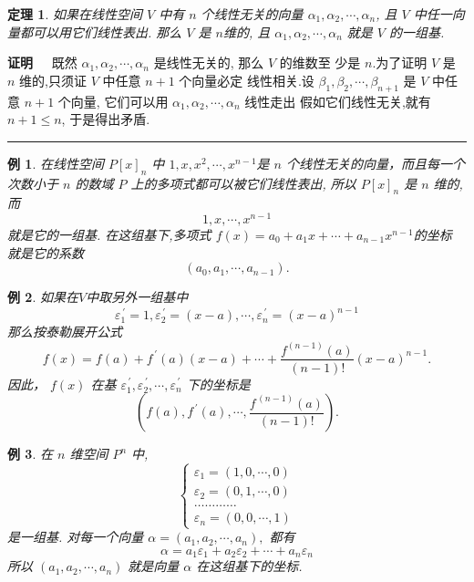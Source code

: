 \documentclass[13pt]{beamer}
\newtheorem{thm}{定理}
\newtheorem{exa}{例}
\def\qed{\nopagebreak\hfill{\rule{4pt}{7pt}}\medbreak}
\def\pf{{\bf 证明~~ }}
\def\a{\alpha}
\begin{document}
\begin{frame}
\begin{thm}
如果在线性空间 $V$ 中有 $n$ 个线性无关的向量 $\a_{1}, {\a}_{2}, \cdots, {\alpha_n}$, 
且 $V$ 中任一向量都可以用它们线性表出.
那么 $V$ 是 $n$维的, 
且 ${\a}_{1}, {\alpha}_{2}, \cdots, {\alpha}_{n}$ 就是 $V$ 的一组基.
\end{thm}
\pf 
既然 ${\alpha}_{1}, {\alpha}_{2}, \cdots, {\alpha}_{n}$ 是线性无关的, 那么 $V$ 的维数至
少是 $n$.为了证明 $V$ 是 $n$ 维的,只须证 $V$ 中任意 $n+1$ 个向量必定 线性相关.设 ${\beta}_{1}, {\beta}_{2}, \cdots, {\beta}_{n+1}$
是 $V$ 中任意 $n+1$ 个向量, 它们可以用 ${\alpha}_{1}, {\alpha}_{2}, \cdots, {\alpha}_{n}$ 线性走出
假如它们线性无关,就有 $n+1 \leqslant n$, 于是得出矛盾.
\qed
\end{frame}

\begin{frame}
\setcounter{exa}{0}
\begin{exa}
在线性空间 $P[x]_{n}$ 中
$1, x, x^{2}, \cdots, x^{n-1}$是 $n$ 个线性无关的向量，而且每一个次数小于 $n$ 的数域 $P$ 上的多项式都可以被它们线性表出,
所以 $P[x]_{n}$ 是 $n$ 维的,而 $$1, x, \cdots, x^{n-1}$$ 就是它的一组基.
在这组基下,多项式
$f(x)=a_{0}+a_{1} x+\cdots+a_{n-1} x^{n-1}$的坐标 
就是它的系数 $$\left(a_{0}, a_{1}, \cdots, a_{n-1}\right).$$
\end{exa}

\end{frame}

\begin{frame}
\addtocounter{exa}{-1}
\begin{exa}
如果在$V$中取另外一组基中
$$\varepsilon_{1}^{\, \prime}=1, {\varepsilon}_{2}^{\, \prime}=(x-a) , \cdots, {\varepsilon}_{n}^{\, \prime}=(x-a)^{n-1}$$
那么按泰勒展开公式
$$f(x)=f(a)+f^{\,\prime}(a)(x-a)+\cdots+\frac{f^{(n-1)}(a)}{(n-1) !}(x-a)^{n-1}.$$
因此， $f(x)$ 在基 ${\varepsilon}_{1}^{\, \prime}, {\varepsilon}_{2}^{\, \prime}, \cdots, {\varepsilon}_{n}^{\, \prime}$ 下的坐标是
$$\left( f(a), f^{\,\prime}(a), \cdots, \frac{f^{\,(n-1)}(a)}{(n-1)!}\right).$$
\end{exa}
\end{frame}


\begin{frame}
\setcounter{exa}{1}
\begin{exa}
在 $n$ 维空间 $P^n$ 中,
\[
\left\{\begin{array}{l}
{\varepsilon}_{1}=(1,0, \cdots, 0) \\
{\varepsilon}_{2}=(0,1, \cdots, 0) \\
\ldots \ldots \ldots \ldots \\
{\varepsilon}_{n}=(0,0, \cdots, 1)
\end{array}\right.
\]
是一组基.
对每一个向量 ${\alpha}=\left(a_{1}, a_{2}, \cdots, a_{n}\right),$ 都有
\[
{\alpha}=a_{1} {\varepsilon}_{1}+a_{2} {\varepsilon}_{2}+\cdots+a_{n} {\varepsilon}_{n}
\]
所以 $\left(a_{1}, a_{2}, \cdots, a_{n}\right)$ 就是向量 ${\alpha}$ 在这组基下的坐标.

\end{exa}
\end{frame}
\end{document}
